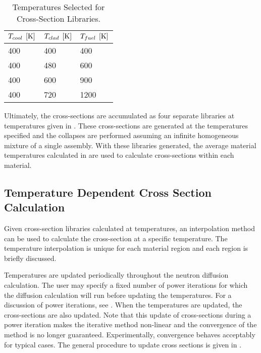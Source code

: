    \begin{table}
      \caption{Temperatures Selected for Cross-Section Libraries.}
      \label{tab:xstemps}
      \begin{center}
        \begin{tabular}{lll}
          \toprule
          $T_{cool} \;\left[\text{{K}}\right]$ & $T_{clad} \;\left[\text{{K}}\right]$ & $T_{fuel} \;\left[\text{{K}}\right]$ \\
          \midrule
          400 & 400 & 400  \\
          400 & 480 & 600  \\
          400 & 600 & 900  \\
          400 & 720 & 1200 \\
          \bottomrule
        \end{tabular}
      \end{center}
    \end{table}

    Ultimately, the cross-sections are accumulated as four separate libraries at
    temperatures given in . These cross-sections are generated
    at the temperatures specified and the collapses are performed assuming an
    infinite homogeneous mixture of a single assembly. With these libraries
    generated, the average material temperatures calculated in 
     are used to calculate cross-sections within each
    material.

  \subsection{Temperature Dependent Cross Section Calculation}
    Given cross-section libraries calculated at temperatures, an interpolation
    method can be used to calculate the cross-section at a specific temperature.
    The temperature interpolation is unique for each material region and each
    region is briefly discussed.

    Temperatures are updated periodically throughout the neutron diffusion
    calculation. The user may specify a fixed number of power iterations for
    which the diffusion calculation will run before updating the temperatures.
    For a discussion of power iterations, see . When
    the temperatures are updated, the cross-sections are also updated. Note that
    this update of cross-sections during a power iteration makes the iterative
    method non-linear and the convergence of the method is no longer guaranteed.
    Experimentally, convergence behaves acceptably for typical cases. The
    general procedure to update cross sections is given in
    .

